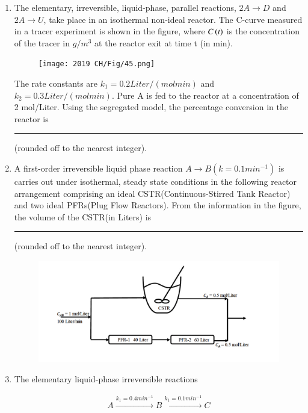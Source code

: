 \documentclass[journal,12pt,onecolumn]{IEEEtran}
\theoremstyle{remark}
\begin{document}
\begin{enumerate}
\hfill{}

    \item The elementary, irreversible, liquid-phase, parallel reactions, $2A \to D$ and $2A\to U$, take place in an isothermal non-ideal reactor. The C-curve measured in a tracer experiment is shown in the figure, where $C\left(t\right)$ is the concentration of the tracer in $g/m^3$ at the reactor exit at time t (in min). 

\hfill{}
\begin{figure}[H]
    \centering
    \texttt{[image: 2019 CH/Fig/45.png]}
    \caption{}
    \label{fig:45}
\end{figure}

    The rate constants are $k_1 = 0.2 Liter/(mol min)$ and $k_2 = 0.3 Liter/(mol min)$. Pure A is fed to the reactor at a concentration of 2 mol/Liter. Using the segregated model, the percentage conversion in the reactor is \rule{1.5cm}{0.1mm}(rounded off to the nearest integer).
    
\hfill{}
\newpage
    \item A first-order irreversible liquid phase reaction $A \to B(k = 0.1 min^{-1})$ is carries out under isothermal, steady state conditions in the following reactor arrangement comprising an ideal CSTR(Continuous-Stirred Tank Reactor) and two ideal PFRs(Plug Flow Reactors). From the information in the figure, the volume of the CSTR(in Liters) is \rule{1.5cm}{0.1mm}(rounded off to the nearest integer).
    
\hfill{}
\begin{figure}[H]
    \centering
    \includegraphics[width=0.6 \columnwidth]{Fig/46.png}
    \caption*{}
    \label{fig: 46}
\end{figure}
    \item 
        The elementary liquid-phase irreversible reactions 
    
\begin{align*}
     A \xrightarrow{{k_1 = 0.4 min^{-1}}} B \xrightarrow{{k_1 = 0.1 min^{-1}}} C
\end{align*}


\end{enumerate}
\end{document}
